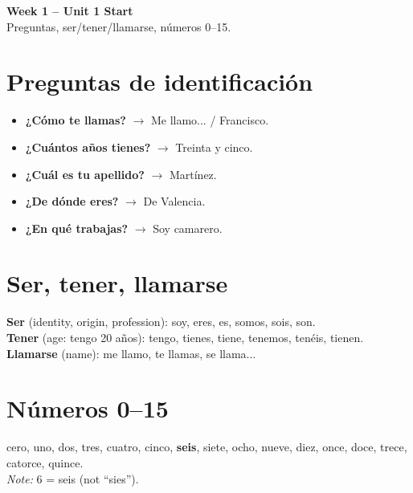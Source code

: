 \documentclass[10pt,a4paper]{article}
\begin{document}
\begin{center}
{\large\bfseries\color{w1blue} Week 1 -- Unit 1 Start}\\[0.2em]
\footnotesize Preguntas, ser/tener/llamarse, n\'umeros 0--15.
\end{center}\vspace{0.5em}

\section*{\color{w1blue}Preguntas de identificaci\'on}
\begin{itemize}
\item \textbf{¿C\'omo te llamas?} $\to$ Me llamo... / Francisco.
\item \textbf{¿Cu\'antos a\~nos tienes?} $\to$ Treinta y cinco.
\item \textbf{¿Cu\'al es tu apellido?} $\to$ Mart\'inez.
\item \textbf{¿De d\'onde eres?} $\to$ De Valencia.
\item \textbf{¿En qu\'e trabajas?} $\to$ Soy camarero.
\end{itemize}

\section*{\color{w1blue}Ser, tener, llamarse}
\textbf{Ser} (identity, origin, profession): soy, eres, es, somos, sois, son. \\
\textbf{Tener} (age: tengo 20 a\~nos): tengo, tienes, tiene, tenemos, ten\'eis, tienen. \\
\textbf{Llamarse} (name): me llamo, te llamas, se llama...

\section*{\color{w1blue}N\'umeros 0--15}
cero, uno, dos, tres, cuatro, cinco, \textbf{seis}, siete, ocho, nueve, diez, once, doce, trece, catorce, quince. \\
\textit{Note:} 6 = seis (not ``sies'').
\end{document}
